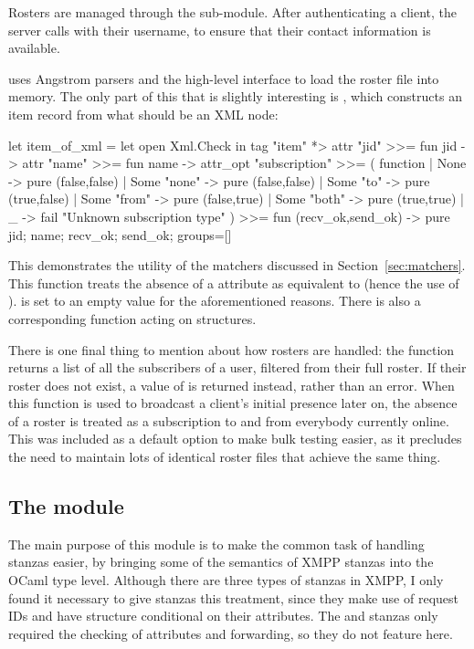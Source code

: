 \documentclass[12pt,a4paper,twoside,openright]{report}
\begin{document}
{Rosters are managed through the  sub-module. After authenticating a client, the server calls  with their username, to ensure that their contact information is available.

 uses Angstrom parsers and the high-level  interface to load the roster file into memory. The only part of this that is slightly interesting is , which constructs an item record from what should be an  XML node:

\begin{ocaml}
let item_of_xml =
  let open Xml.Check in
  tag "item" *> attr "jid" >>= fun jid ->
    attr "name" >>= fun name ->
      attr_opt "subscription" >>= ( function
      | None        -> pure (false,false)
      | Some "none" -> pure (false,false)
      | Some "to"   -> pure (true,false)
      | Some "from" -> pure (false,true)
      | Some "both" -> pure (true,true)
      | _ -> fail "Unknown subscription type" ) >>=
  fun (recv_ok,send_ok) ->
    pure { jid; name; recv_ok; send_ok; groups=[] }
\end{ocaml}

This demonstrates the utility of the  matchers discussed in Section~\ref{sec:matchers}. This function treats the absence of a  attribute as equivalent to  (hence the use of ).  is set to an empty value for the aforementioned reasons. There is also a corresponding  function acting on  structures.

There is one final thing to mention about how rosters are handled: the function  returns a list of all the subscribers of a user, filtered from their full roster. If their roster does not exist, a value of  is returned instead, rather than an error. When this function is used to broadcast a client's initial presence later on, the absence of a roster is treated as a subscription to and from everybody currently online. This was included as a default option to make bulk testing easier, as it precludes the need to maintain lots of identical roster files that achieve the same thing.

\subsection{The  module}
The main purpose of this module is to make the common task of handling stanzas easier, by bringing some of the semantics of XMPP stanzas into the OCaml type level. Although there are three types of stanzas in XMPP, I only found it necessary to give  stanzas this treatment, since they make use of request IDs and have structure conditional on their attributes. The  and  stanzas only required the checking of attributes and forwarding, so they do not feature here.

}
\end{document}
